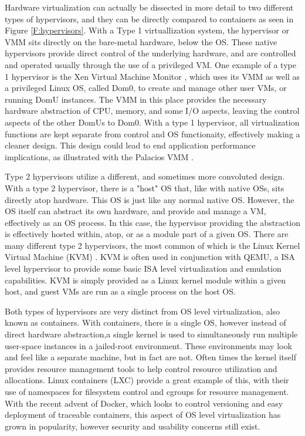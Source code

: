 Hardware virtualization can actually be dissected in more detail to two different types of hypervisors, and they can be directly compared to containers as seen in Figure \ref{F:hypervisors}. With a Type 1 virtuallization system, the hypervisor or VMM sits directly on the bare-metal hardware, below the OS. These native hypervisors provide direct control of the underlying hardware, and are controlled and operated usually through the use of a privileged VM.  One example of a type 1 hypervisor is the Xen Virtual Machine Monitor \cite{Barham2003}, which uses its VMM as well as a privileged Linux OS, called Dom0, to create and manage other user VMs, or running DomU instances. The VMM in this place provides the necessary hardware abstraction of CPU, memory, and some I/O aspects, leaving the control aspects of the other DomUs to Dom0.  With a type 1 hypervisor, all virtualization functions are kept separate from control and OS functionaity, effectively making a cleaner design.  This design could lead to end application performance implications, as illustrated with the Palacios VMM \cite{lange2010palacios}. 

Type 2 hypervisors utilize a different, and sometimes more convoluted design. With a type 2 hypervisor, there is a "host" OS that, like with native OSs, sits directly atop hardware. This OS is just like any normal native OS. However, the OS itself can abstract its own hardware, and provide and manage a VM, effectively as an OS process.  In this case, the hypervisor providing the abstraction is effectively hosted within, atop, or as a module part of a given OS.  There are many different type 2 hypervisors, the most common of which is the Linux Kernel Virtual Machine (KVM) \cite{kivity2007kvm}. KVM is often used in conjunction with QEMU, a ISA level hypervisor to provide some basic ISA level virtualization and emulation capabilities. KVM is simply provided as a Linux kernel module within a given host, and guest VMs are run as a single process on the host OS. 
 
Both types of hypervisors are very distinct from OS level virtualization, also known as containers. With containers, there is a single OS, however instead of direct hardware abstraction,a single kernel is used to simultaneously run multiple user-space instances in a jailed-root environment. These environments may look and feel like a separate machine, but in fact are not. Often times the kernel itself provides resource management tools to help control resource utilization and allocations. Linux containers (LXC) provide a great example of this, with their use of namespaces for filesystem control and cgroups for resource management. With the recent advent of Docker, which looks to control versioning and easy deployment of traceable containers, this aspect of OS level virtualization has grown in popularity, however security and usability concerns still exist.   


